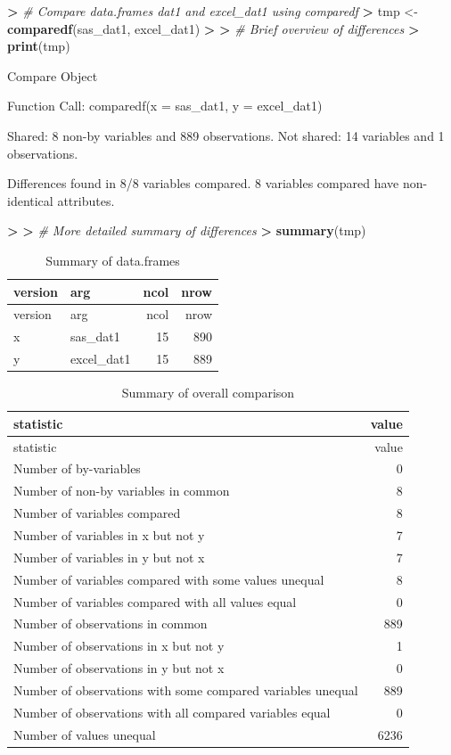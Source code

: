 \documentclass[
]{book}
\newenvironment{Shaded}{\begin{snugshade}}{\end{snugshade}}
\newcommand{\CommentTok}[1]{\textcolor[rgb]{0.56,0.35,0.01}{\textit{#1}}}
\newcommand{\ErrorTok}[1]{\textcolor[rgb]{0.64,0.00,0.00}{\textbf{#1}}}
\newcommand{\KeywordTok}[1]{\textcolor[rgb]{0.13,0.29,0.53}{\textbf{#1}}}
\newcommand{\NormalTok}[1]{#1}
\newcommand{\OperatorTok}[1]{\textcolor[rgb]{0.81,0.36,0.00}{\textbf{#1}}}
\newcommand{\StringTok}[1]{\textcolor[rgb]{0.31,0.60,0.02}{#1}}
\begin{document}
\begin{Shaded}
\begin{Highlighting}[]
\OperatorTok{>}\StringTok{ }\CommentTok{# Compare data.frames dat1 and excel_dat1 using comparedf}
\ErrorTok{>}\StringTok{ }\NormalTok{tmp <-}\StringTok{ }\KeywordTok{comparedf}\NormalTok{(sas_dat1, excel_dat1)}
\OperatorTok{>}\StringTok{ }
\ErrorTok{>}\StringTok{ }\CommentTok{# Brief overview of differences}
\ErrorTok{>}\StringTok{ }\KeywordTok{print}\NormalTok{(tmp)}
\end{Highlighting}
\end{Shaded}

Compare Object

Function Call:
comparedf(x = sas\_dat1, y = excel\_dat1)

Shared: 8 non-by variables and 889 observations.
Not shared: 14 variables and 1 observations.

Differences found in 8/8 variables compared.
8 variables compared have non-identical attributes.

\begin{Shaded}
\begin{Highlighting}[]
\OperatorTok{>}\StringTok{ }
\ErrorTok{>}\StringTok{ }\CommentTok{# More detailed summary of differences}
\ErrorTok{>}\StringTok{ }\KeywordTok{summary}\NormalTok{(tmp)}
\end{Highlighting}
\end{Shaded}

\begin{longtable}[]{@{}llrr@{}}
\caption{\label{tab:unnamed-chunk-28}Summary of data.frames}\tabularnewline
\toprule
version & arg & ncol & nrow\tabularnewline
\midrule
\endfirsthead
\toprule
version & arg & ncol & nrow\tabularnewline
\midrule
\endhead
x & sas\_dat1 & 15 & 890\tabularnewline
y & excel\_dat1 & 15 & 889\tabularnewline
\bottomrule
\end{longtable}

\begin{longtable}[]{@{}lr@{}}
\caption{\label{tab:unnamed-chunk-28}Summary of overall comparison}\tabularnewline
\toprule
statistic & value\tabularnewline
\midrule
\endfirsthead
\toprule
statistic & value\tabularnewline
\midrule
\endhead
Number of by-variables & 0\tabularnewline
Number of non-by variables in common & 8\tabularnewline
Number of variables compared & 8\tabularnewline
Number of variables in x but not y & 7\tabularnewline
Number of variables in y but not x & 7\tabularnewline
Number of variables compared with some values unequal & 8\tabularnewline
Number of variables compared with all values equal & 0\tabularnewline
Number of observations in common & 889\tabularnewline
Number of observations in x but not y & 1\tabularnewline
Number of observations in y but not x & 0\tabularnewline
Number of observations with some compared variables unequal & 889\tabularnewline
Number of observations with all compared variables equal & 0\tabularnewline
Number of values unequal & 6236\tabularnewline
\bottomrule
\end{longtable}
\end{document}
